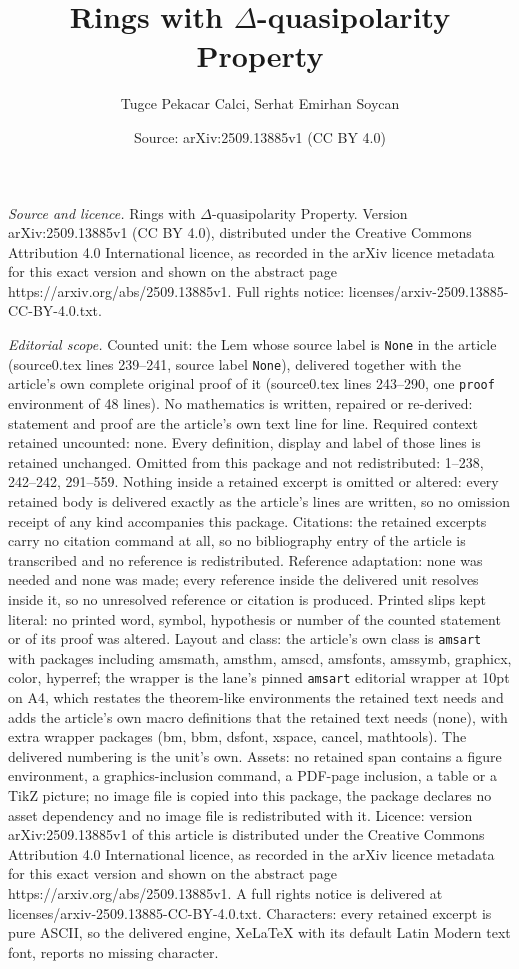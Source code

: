 \documentclass[10pt,a4paper]{amsart}
\title[Rings with $\Delta$-quasipolarity Property]{Rings with $\Delta$-quasipolarity Property}
\author{Tugce Pekacar Calci, Serhat Emirhan Soycan}
\date{Source: arXiv:2509.13885v1 (CC BY 4.0)}
\begin{document}
\maketitle

\noindent\emph{Source and licence.} Rings with $\Delta$-quasipolarity Property. Version arXiv:2509.13885v1 (CC BY 4.0), distributed under the Creative Commons Attribution 4.0 International licence, as recorded in the arXiv licence metadata for this exact version and shown on the abstract page https://arxiv.org/abs/2509.13885v1. Full rights notice: licenses/arxiv-2509.13885-CC-BY-4.0.txt.\par\smallskip

\noindent\textit{Editorial scope.} Counted unit: the Lem whose source label is \texttt{None} in the article (source0.tex lines 239--241, source label \texttt{None}), delivered together with the article's own complete original proof of it (source0.tex lines 243--290, one \texttt{proof} environment of 48 lines). No mathematics is written, repaired or re-derived: statement and proof are the article's own text line for line. Required context retained uncounted: none. Every definition, display and label of those lines is retained unchanged. Omitted from this package and not redistributed: 1--238, 242--242, 291--559. Nothing inside a retained excerpt is omitted or altered: every retained body is delivered exactly as the article's lines are written, so no omission receipt of any kind accompanies this package. Citations: the retained excerpts carry no citation command at all, so no bibliography entry of the article is transcribed and no reference is redistributed. Reference adaptation: none was needed and none was made; every reference inside the delivered unit resolves inside it, so no unresolved reference or citation is produced. Printed slips kept literal: no printed word, symbol, hypothesis or number of the counted statement or of its proof was altered. Layout and class: the article's own class is \texttt{amsart} with packages including amsmath, amsthm, amscd, amsfonts, amssymb, graphicx, color, hyperref; the wrapper is the lane's pinned \texttt{amsart} editorial wrapper at 10pt on A4, which restates the theorem-like environments the retained text needs and adds the article's own macro definitions that the retained text needs (none), with extra wrapper packages (bm, bbm, dsfont, xspace, cancel, mathtools). The delivered numbering is the unit's own. Assets: no retained span contains a figure environment, a graphics-inclusion command, a PDF-page inclusion, a table or a TikZ picture; no image file is copied into this package, the package declares no asset dependency and no image file is redistributed with it. Licence: version arXiv:2509.13885v1 of this article is distributed under the Creative Commons Attribution 4.0 International licence, as recorded in the arXiv licence metadata for this exact version and shown on the abstract page https://arxiv.org/abs/2509.13885v1. A full rights notice is delivered at licenses/arxiv-2509.13885-CC-BY-4.0.txt. Characters: every retained excerpt is pure ASCII, so the delivered engine, XeLaTeX with its default Latin Modern text font, reports no missing character.
\end{document}
